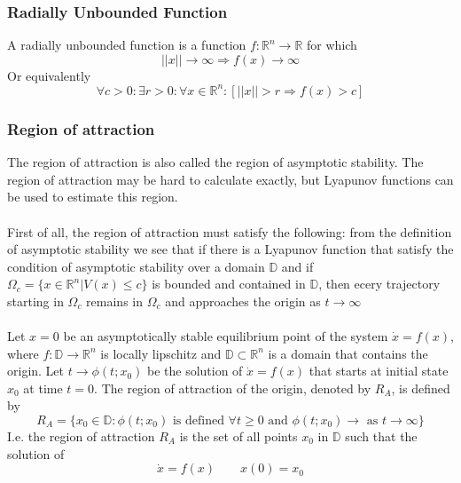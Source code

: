 \documentclass{article}
\newcommand{\mathbbD}{\mathbb{D}}
\begin{document}
\subsubsection{Radially Unbounded Function}
A radially unbounded function is a function $f : \mathbb{R}^n \rightarrow
	\mathbb{R}$ for which
\begin{equation*}
	||x|| \rightarrow \infty \Rightarrow f(x) \rightarrow \infty
\end{equation*}
Or equivalently
\begin{equation*}
	\forall c > 0 : \exists r > 0 : \forall x \in \mathbb{R}^n : [||x|| > r \Rightarrow f(x) > c]
\end{equation*}
\subsubsection{Region of attraction}
The region of attraction is also called the region of asymptotic stability. The
region of attraction may be hard to calculate exactly, but Lyapunov functions
can be used to estimate this region. \\\\ First of all, the region of
attraction must satisfy the following: from the definition of asymptotic
stability we see that if there is a Lyapunov function that satisfy the
condition of asymptotic stability over a domain $\mathbb{D}$ and if $\Omega_c =
	\{ x \in \mathbb{R}^n | V(x) \leq c\}$ is bounded and contained in $\mathbbD$,
then ecery trajectory starting in $\Omega_c$ remains in $\Omega_c$ and
approaches the origin as $t \to \infty$ \\\\ Let $x=0$ be an asymptotically
stable equilibrium point of the system $\dot x = f(x)$, where $f : \mathbb{D}
	\to \mathbb{R}^n$ is locally lipschitz and $\mathbb{D} \subset \mathbb{R}^n$ is
a domain that contains the origin. Let $t \to \phi(t;x_0)$ be the solution of
$\dot x = f(x)$ that starts at initial state $x_0$ at time $t=0$. The region of
attraction of the origin, denoted by $R_A$, is defined by
\begin{equation*}
	R_A = \{ x_0 \in \mathbb{D} : \phi(t;x_0) \text{ is defined }\forall t \geq 0 \text{ and } \phi(t;x_0) \to \text{ as } t \to \infty \}
\end{equation*}
I.e. the region of attraction $R_A$ is the set of all points $x_0$ in $\mathbb{D}$ such that the solution of
\begin{equation*}
	\dot x = f(x) \qquad x(0) = x_0
\end{equation*}
\end{document}
